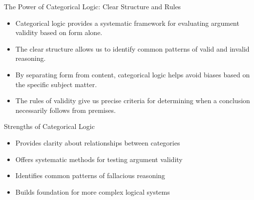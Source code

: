 \documentclass{beamer}
\begin{document}
	\begin{frame}{The Power of Categorical Logic: Clear Structure and Rules}
		\begin{itemize}
			\item Categorical logic provides a systematic framework for evaluating argument validity based on form alone.
			\item The clear structure allows us to identify common patterns of valid and invalid reasoning.
			\item By separating form from content, categorical logic helps avoid biases based on the specific subject matter.
			\item The rules of validity give us precise criteria for determining when a conclusion necessarily follows from premises.
		\end{itemize}
		
		\begin{block}{Strengths of Categorical Logic}
			\scriptsize
			\begin{itemize}
				\item Provides clarity about relationships between categories
				\item Offers systematic methods for testing argument validity
				\item Identifies common patterns of fallacious reasoning
				\item Builds foundation for more complex logical systems
			\end{itemize}
		\end{block}
	\end{frame}
	
\end{document}
